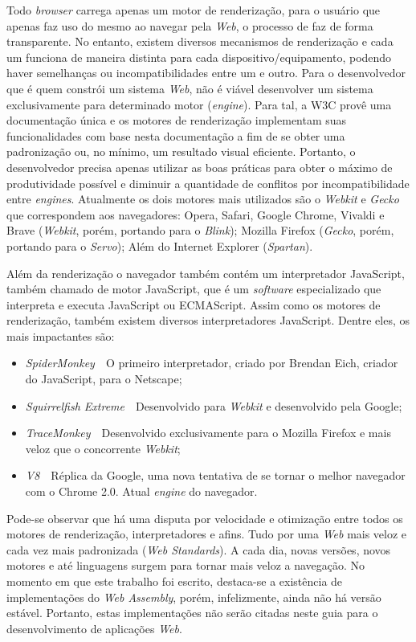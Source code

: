 Todo \textit{browser} carrega apenas um motor de renderização, para o usuário que apenas faz uso do mesmo ao navegar pela \textit{Web}, o processo de faz de forma transparente. No entanto, existem diversos mecanismos de renderização e cada um funciona de maneira distinta para cada dispositivo/equipamento, podendo haver semelhanças ou incompatibilidades entre um e outro. Para o desenvolvedor que é quem constrói um sistema \textit{Web}, não é viável desenvolver um sistema exclusivamente para determinado motor (\textit{engine}). Para tal, a W3C provê uma documentação única e os motores de renderização implementam suas funcionalidades com base nesta documentação a fim de se obter uma padronização ou, no mínimo, um resultado visual eficiente. Portanto, o desenvolvedor precisa apenas utilizar as boas práticas para obter o máximo de produtividade possível e diminuir a quantidade de conflitos por incompatibilidade entre \textit{engines}. Atualmente os dois motores mais utilizados são o \textit{Webkit} e \textit{Gecko} que correspondem aos navegadores: Opera, Safari, Google Chrome, Vivaldi e Brave (\textit{Webkit}, porém, portando para o \textit{Blink}); Mozilla Firefox (\textit{Gecko}, porém, portando para o \textit{Servo}); Além do Internet Explorer (\textit{Spartan}).

Além da renderização o navegador também contém um interpretador JavaScript, também chamado de motor JavaScript, que é um \textit{software} especializado que interpreta e executa JavaScript ou ECMAScript. Assim como os motores de renderização, também existem diversos interpretadores JavaScript. Dentre eles, os mais impactantes são:
\begin{itemize}
    \item \textit{SpiderMonkey}~\textemdash~O primeiro interpretador, criado por Brendan Eich, criador do JavaScript, para o Netscape;
    \item \textit{Squirrelfish Extreme}~\textemdash~Desenvolvido para \textit{Webkit} e desenvolvido pela Google;
    \item \textit{TraceMonkey}~\textemdash~Desenvolvido exclusivamente para o Mozilla Firefox e mais veloz que o concorrente \textit{Webkit};
    \item \textit{V8}~\textemdash~Réplica da Google, uma nova tentativa de se tornar o melhor navegador com o Chrome 2.0. Atual \textit{engine} do navegador.
\end{itemize}

Pode-se observar que há uma disputa por velocidade e otimização entre todos os motores de renderização, interpretadores e afins. Tudo por uma \textit{Web} mais veloz e cada vez mais padronizada (\textit{Web Standards}). A cada dia, novas versões, novos motores e até linguagens surgem para tornar mais veloz a navegação. No momento em que este trabalho foi escrito, destaca-se a existência de implementações do \textit{Web Assembly}, porém, infelizmente, ainda não há versão estável. Portanto, estas implementações não serão citadas neste guia para o desenvolvimento de aplicações \textit{Web}.

